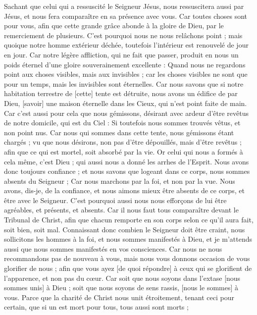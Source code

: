 \begin{multicols}{2}
Sachant que celui qui a ressuscité le Seigneur Jésus, nous ressuscitera aussi par Jésus, et nous fera comparaître en sa présence avec vous.
Car toutes choses sont pour vous, afin que cette grande grâce abonde à la gloire de Dieu, par le remerciement de plusieurs.
C'est pourquoi nous ne nous relâchons point ; mais quoique notre homme extérieur déchée, toutefois l'intérieur est renouvelé de jour en jour.
Car notre légère affliction, qui ne fait que passer, produit en nous un poids éternel d'une gloire souverainement excellente :
Quand nous ne regardons point aux choses visibles, mais aux invisibles ; car les choses visibles ne sont que pour un temps, mais les invisibles sont éternelles.
\VerseOne{}Car nous savons que si notre habitation terrestre de [cette] tente est détruite, nous avons un édifice de par Dieu, [savoir] une maison éternelle dans les Cieux, qui n'est point faite de main.
Car c'est aussi pour cela que nous gémissons, désirant avec ardeur d'être revêtus de notre domicile, qui est du Ciel :
Si toutefois nous sommes trouvés vêtus, et non point nus.
Car nous qui sommes dans cette tente, nous gémissons étant chargés ; vu que nous désirons, non pas d'être dépouillés, mais d'être revêtus ; afin que ce qui est mortel, soit absorbé par la vie.
Or celui qui nous a formés à cela même, c'est Dieu ; qui aussi nous a donné les arrhes de l'Esprit.
Nous avons donc toujours confiance ; et nous savons que logeant dans ce corps, nous sommes absents du Seigneur ;
Car nous marchons par la foi, et non par la vue.
Nous avons, dis-je, de la confiance, et nous aimons mieux être absents de ce corps, et être avec le Seigneur.
C'est pourquoi aussi nous nous efforçons de lui être agréables, et présents, et absents.
Car il nous faut tous comparaître devant le Tribunal de Christ, afin que chacun remporte en son corps selon ce qu'il aura fait, soit bien, soit mal.
Connaissant donc combien le Seigneur doit être craint, nous sollicitons les hommes à la foi, et nous sommes manifestés à Dieu, et je m'attends aussi que nous sommes manifestés en vos consciences.
Car nous ne nous recommandons pas de nouveau à vous, mais nous vous donnons occasion de vous glorifier de nous ; afin que vous ayez [de quoi répondre] à ceux qui se glorifient de l'apparence, et non pas du cœur.
Car soit que nous soyons dans l'extase [nous sommes unis] à Dieu ; soit que nous soyons de sens rassis, [nous le sommes] à vous.
Parce que la charité de Christ nous unit étroitement, tenant ceci pour certain, que si un est mort pour tous, tous aussi sont morts ;

\end{multicols}
